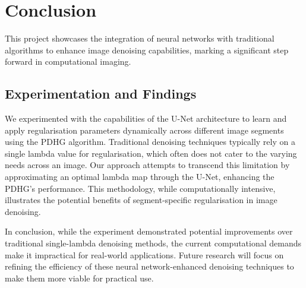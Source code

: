 \documentclass[12pt]{article}
\begin{document}
\section{Conclusion}

This project showcases the integration of neural networks with traditional algorithms to enhance image denoising capabilities, marking a significant step forward in computational imaging.

\subsection{Experimentation and Findings}

We experimented with the capabilities of the U-Net architecture to learn and apply regularisation parameters dynamically across different image segments using the PDHG algorithm. Traditional denoising techniques typically rely on a single lambda value for regularisation, which often does not cater to the varying needs across an image. Our approach attempts to transcend this limitation by approximating an optimal lambda map through the U-Net, enhancing the PDHG's performance. This methodology, while computationally intensive, illustrates the potential benefits of segment-specific regularisation in image denoising.



In conclusion, while the experiment demonstrated potential improvements over traditional single-lambda denoising methods, the current computational demands make it impractical for real-world applications. Future research will focus on refining the efficiency of these neural network-enhanced denoising techniques to make them more viable for practical use.


\newpage




\printbibliography
\end{document}
